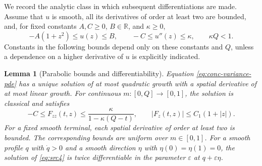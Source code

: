 \documentclass[11pt,a4paper]{article}
\numberwithin{equation}{section}
\newtheorem{lemma}[theorem]{Lemma}
\theoremstyle{definition}
\theoremstyle{remark}
\newcommand{\R}{\mathbb R}
\begin{document}
We record the analytic class in which subsequent differentiations are made.
Assume that $u$ is smooth, all its derivatives of order at least two are
bounded, and, for fixed constants $A,C\geq0$, $B\in\R$, and $\kappa\geq0$,
\begin{equation}
 -A(1+z^2)\leq u(z)\leq B,\qquad
 -C\leq u''(z)\leq\kappa,\qquad \kappa Q<1.
 \label{eq:conc-terminal-class}
\end{equation}
Constants in the following bounds depend only on these constants and $Q$,
unless a dependence on a higher derivative of $u$ is explicitly indicated.

\begin{lemma}[Parabolic bounds and differentiability]
\label{lem:conc-regularity}
Equation \eqref{eq:conc-variance-pde} has a unique solution of at most quadratic
growth with a spatial derivative of at most linear growth.  For continuous
$m:[0,Q]\to[0,1]$, the solution is classical and satisfies
\begin{equation}
 -C\leq F_{zz}(t,z)\leq\frac{\kappa}{1-\kappa(Q-t)},
 \qquad |F_z(t,z)|\leq C_1(1+|z|).
 \label{eq:conc-parabolic-bounds}
\end{equation}
For a fixed smooth terminal, each spatial derivative of order at least two
is bounded.  The corresponding bounds are uniform over $m\in[0,1]$.
For a smooth profile $q$ with $\dot q>0$ and a smooth direction $\eta$ with
$\eta(0)=\eta(1)=0$, the solution of \eqref{eq:src4} is twice differentiable
in the parameter $\varepsilon$ at $q+\varepsilon\eta$.
\end{lemma}
\end{document}

